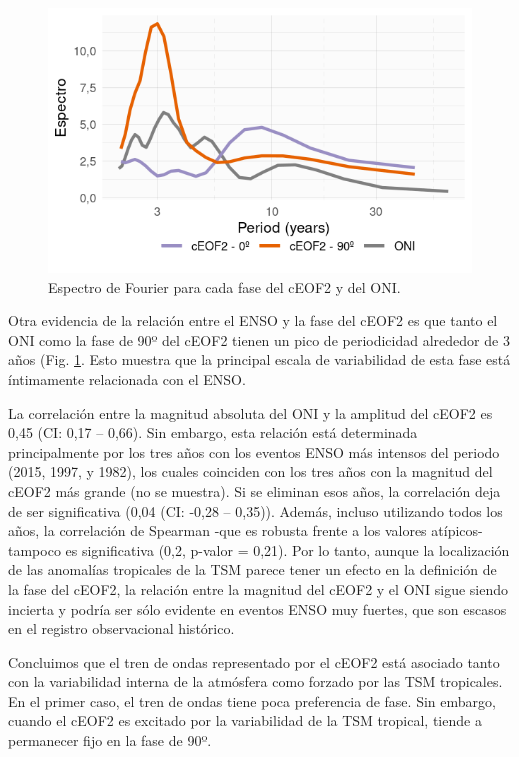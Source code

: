 \documentclass[12pt,oneside,a4paper]{reedthesis}
\begin{document}
\begin{figure}

{\centering \includegraphics{figures/20-ceofs/fft-ceof-era5-1} 

}

\caption{Espectro de Fourier para cada fase del cEOF2 y del ONI.}\label{fig:fft-ceof-era5}
\end{figure}



Otra evidencia de la relación entre el ENSO y la fase del cEOF2 es que tanto el ONI como la fase de 90º del cEOF2 tienen un pico de periodicidad alrededor de 3 años (Fig. \ref{fig:fft-ceof-era5}.
Esto muestra que la principal escala de variabilidad de esta fase está íntimamente relacionada con el ENSO.

La correlación entre la magnitud absoluta del ONI y la amplitud del cEOF2 es 0,45 (CI: 0,17 -- 0,66).
Sin embargo, esta relación está determinada principalmente por los tres años con los eventos ENSO más intensos del periodo (2015, 1997, y 1982), los cuales coinciden con los tres años con la magnitud del cEOF2 más grande (no se muestra).
Si se eliminan esos años, la correlación deja de ser significativa (0,04 (CI: -0,28 -- 0,35)).
Además, incluso utilizando todos los años, la correlación de Spearman -que es robusta frente a los valores atípicos- tampoco es significativa (0,2, p-valor = 0,21).
Por lo tanto, aunque la localización de las anomalías tropicales de la TSM parece tener un efecto en la definición de la fase del cEOF2, la relación entre la magnitud del cEOF2 y el ONI sigue siendo incierta y podría ser sólo evidente en eventos ENSO muy fuertes, que son escasos en el registro observacional histórico.

Concluimos que el tren de ondas representado por el cEOF2 está asociado tanto con la variabilidad interna de la atmósfera como forzado por las TSM tropicales.
En el primer caso, el tren de ondas tiene poca preferencia de fase.
Sin embargo, cuando el cEOF2 es excitado por la variabilidad de la TSM tropical, tiende a permanecer fijo en la fase de 90º.
\end{document}
